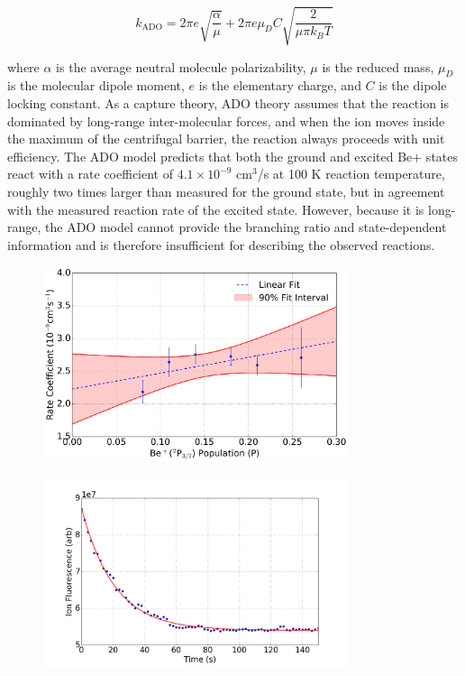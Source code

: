 \begin{equation}
	k_{\text{ADO}} = 2 \pi e \sqrt{\frac{\alpha}{\mu}} + 2 \pi e \mu_D C \sqrt{\frac{2}{\mu \pi k_B T}}
\end{equation}

where $\alpha$ is the average neutral molecule polarizability, $\mu$ is the reduced mass, $\mu_D$ is the molecular dipole moment, $e$ is the elementary charge, and $C$ is the dipole locking constant. As a capture theory, ADO theory assumes that the reaction is dominated by long-range inter-molecular forces, and when the ion moves inside the maximum of the centrifugal barrier, the reaction always proceeds with unit efficiency. The ADO model predicts that both the ground and excited Be+ states react with a rate coefficient of $4.1 \times 10^{-9}$ cm$^3$/s at 100 K reaction temperature, roughly two times larger than measured for the ground state, but in agreement with the measured reaction rate of the excited state. However, because it is long-range, the ADO model cannot provide the branching ratio and state-dependent information and is therefore insufficient for describing the observed reactions.

\begin{figure}[H]
	\centering
	\includegraphics[width=0.8\textwidth]{images/Be_H2O_p_state.png}
	\caption{}
	\label{fig: Be+H2O P-state}
\end{figure}

\begin{figure}[H]
	\centering
	\includegraphics[width=0.8\textwidth]{images/Be_H2O_fluorescence.png}
	\caption{}
	\label{fig: Be+H2O fluorescence}
\end{figure}


